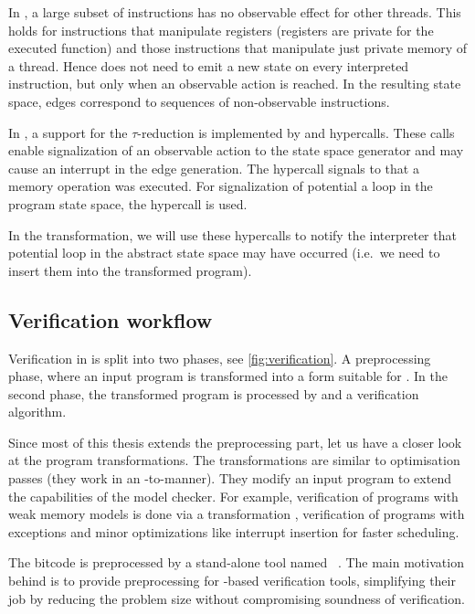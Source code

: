 In \LLVM, a large subset of instructions has no observable effect for other
threads. This holds for instructions that manipulate registers (registers are
private for the executed function) and those instructions that manipulate just private memory of a thread. Hence \DIVINE does not need to emit a new state on
every interpreted instruction, but only when an observable action is reached. In
the resulting state space, edges correspond to sequences of non-observable
instructions.

In \DIVM, a support for the $\tau$-reduction is implemented by
 and  hypercalls. These calls enable
signalization of an observable action to the state space generator and may cause
an interrupt in the edge generation. The  hypercall
signals to \DIVM that a memory operation was executed. For signalization of
potential a loop in the program state space, the  hypercall
is used.

In the transformation, we will use these hypercalls to notify the interpreter
that potential loop in the abstract state space may have occurred (i.e.~we need
to insert them into the transformed program).

\subsection{Verification workflow}

Verification in \DIVINE is split into two phases, see
\autoref{fig:verification}.  A preprocessing phase, where an input program is
transformed into a form suitable for \DIVM. In the second phase, the
transformed program is processed by \DIVM and a verification algorithm.

Since most of this thesis extends the preprocessing part, let us have a closer
look at the program transformations. The transformations are similar to \LLVM
optimisation passes (they work in an \LLVM -to-\LLVM manner). They modify an
input program to extend the capabilities of the model checker. For
example, verification of programs with weak memory models is done via a
transformation \cite{Still16}, verification of programs with exceptions
\cite{Still17} and minor optimizations like interrupt insertion for faster
scheduling.

The \LLVM bitcode is preprocessed by a stand-alone tool named
\LART~\cite{Rockai15}. The main motivation behind \LART is to provide preprocessing for \LLVM
-based verification tools, simplifying their job by reducing the problem size
without compromising soundness of verification.

